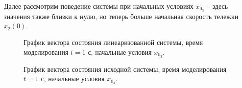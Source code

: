 Далее рассмотрим поведение системы при начальных условиях $x_{0_3}$ -- здесь значения также близки к нулю, но теперь больше начальная скорость тележки $x_2(0)$.

\begin{figure}[!h]
\caption{График вектора состояния линеаризованной системы, время моделирования $t=1$ с, начальные условия $x_{0_3}$.}
\label{2_x_lin_03_sm}
\end{figure}

\begin{figure}[!h]
\caption{График вектора состояния исходной системы, время моделирования $t=1$ с, начальные условия $x_{0_3}$.}
\label{2_x_nlin_03_sm}
\end{figure}

